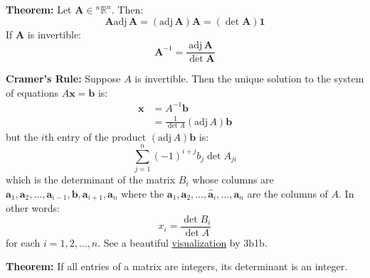 \documentclass{article}
\newcommand{\bff}[1]{\mathbf{#1}}
\newcommand{\adj}[1]{\mathrm{adj}\,#1}
\begin{document}
\begin{minipage}[t]{0.45\linewidth}
        \textbf{Theorem:} Let $\bff{A} \in {^n}\mathbb{R}^n$. Then:
        \begin{equation*}
            \bff{A}\adj \bff{A} = (\adj \bff{A})\bff{A} = (\det \bff{A}) \bff{1}
        \end{equation*}
        If $\bff{A}$ is invertible:
        \begin{equation*}
            \bff{A}^{-1} = \frac{\adj \bff{A}}{\det \bff{A}}
        \end{equation*}
    \end{minipage}\hfill
    \begin{minipage}[t]{0.45\linewidth}
        \textbf{Cramer's Rule:} Suppose $A$ is invertible. Then the unique solution to the system of equations $A\bff{x}=\bff{b}$ is:
        \begin{align*}
            \bff{x} &= A^{-1}\bff{b} \\ 
            &= \frac{1}{\det A}(\adj A) \bff{b}
        \end{align*}
        but the $i$th entry of the product $(\adj A)\bff{b}$ is:
        \begin{equation*}
            \sum_{j=1}^n (-1)^{i+j}b_j \det A_{ji}
        \end{equation*}
        which is the determinant of the matrix $B_i$ whose columns are $\bff{a}_1,\bff{a}_2,\dots,\bff{a}_{i-1},\bff{b},\bff{a}_{i+1},\bff{a}_n$ where the $\bff{a}_1,\bff{a}_2,\dots,\hat{\bff{a}}_i,\dots,\bff{a}_n$ are the columns of $A$. In other words:
        \begin{equation*}
            x_i = \frac{\det B_i}{\det A}
        \end{equation*}
        for each $i=1,2,\dots,n$. See a beautiful \href{https://www.youtube.com/watch?v=jBsC34PxzoM}{visualization} by 3b1b.
        \vspace{2mm}

        \textbf{Theorem:} If all entries of a matrix are integers, its determinant is an integer.
    \end{minipage}
\end{document}
